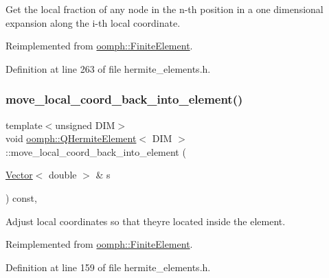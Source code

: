Get the local fraction of any node in the n-\/th position in a one dimensional expansion along the i-\/th local coordinate. 



Reimplemented from \hyperlink{classoomph_1_1FiniteElement_adb8ec7d2ceda37528c2d4542d572edf4}{oomph\+::\+Finite\+Element}.



Definition at line 263 of file hermite\+\_\+elements.\+h.

\mbox{\label{classoomph_1_1QHermiteElement_a2c0eb92b2d66f0c67abebf96bb7922fc}} 
\subsubsection{\texorpdfstring{move\+\_\+local\+\_\+coord\+\_\+back\+\_\+into\+\_\+element()}{move\_local\_coord\_back\_into\_element()}}
{\footnotesize\ttfamily template$<$unsigned D\+IM$>$ \\
void \hyperlink{classoomph_1_1QHermiteElement}{oomph\+::\+Q\+Hermite\+Element}$<$ D\+IM $>$\+::move\+\_\+local\+\_\+coord\+\_\+back\+\_\+into\+\_\+element (\begin{DoxyParamCaption}\item[{\hyperlink{classoomph_1_1Vector}{Vector}$<$ double $>$ \&}]{s }\end{DoxyParamCaption}) const\hspace{0.3cm}{\ttfamily [inline]}, {\ttfamily [virtual]}}



Adjust local coordinates so that they\textquotesingle{}re located inside the element. 



Reimplemented from \hyperlink{classoomph_1_1FiniteElement_aa042b56813a8dd8ac0e1b19ae2bbe9d1}{oomph\+::\+Finite\+Element}.



Definition at line 159 of file hermite\+\_\+elements.\+h.

\mbox{\label{classoomph_1_1QHermiteElement_a30b57c285bdbe9687cb5cc4771393363}} 
